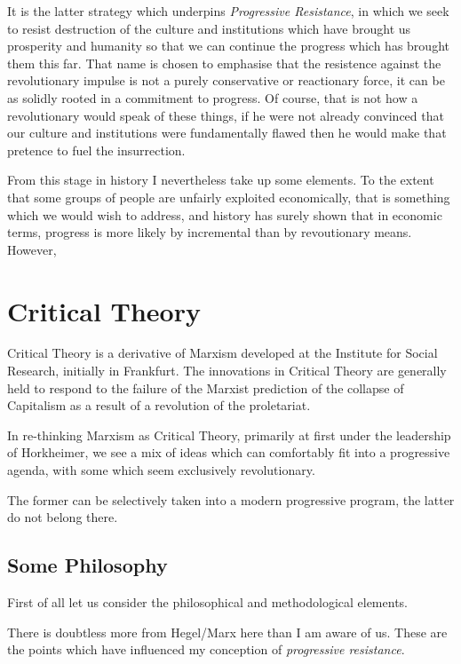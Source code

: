 \documentclass[10pt,titlepage]{book}
\begin{document}
It is the latter strategy which underpins \emph{Progressive Resistance}, in which we seek to resist destruction of the culture and institutions which have brought us prosperity and humanity so that we can continue the progress which has brought them this far.
That name is chosen to emphasise that the resistence against the revolutionary impulse is not a purely conservative or reactionary force, it can be as solidly rooted in a commitment to progress.
Of course, that is not how a revolutionary would speak of these things, if he were not already convinced that our culture and institutions were fundamentally flawed then he would make that pretence to fuel the insurrection.

From this stage in history I nevertheless take up some elements.
To the extent that some groups of people are unfairly exploited economically, that is something which we would wish to address, and history has surely shown that in economic terms, progress is more likely by incremental than by revoutionary means.
However, 


\section{Critical Theory}

Critical Theory is a derivative of Marxism developed at the Institute for Social Research, initially in Frankfurt.
The innovations in Critical Theory are generally held to respond to the failure of the Marxist prediction of the collapse of Capitalism as a result of a revolution of the proletariat.

In re-thinking Marxism as Critical Theory, primarily at first under the leadership of Horkheimer, we see a mix of ideas which can comfortably fit into a progressive agenda, with some which seem exclusively revolutionary.

The former can be selectively taken into a modern progressive program, the latter do not belong there.

\subsection{Some Philosophy}

First of all let us consider the philosophical and methodological elements.

There is doubtless more from Hegel/Marx here than I am aware of us.
These are the points which have influenced my conception of \emph{progressive resistance}.
\end{document}

